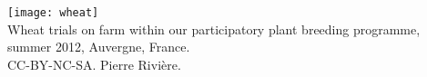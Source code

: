 \vfill




\newpage

\tableofcontents

\vfill

\begin{center}
\texttt{[image: wheat]} \\
Wheat trials on farm within our participatory plant breeding programme, summer 2012, Auvergne, France. \\
CC-BY-NC-SA. Pierre Rivière.
\end{center}

\newpage
\pagestyle{plain}
